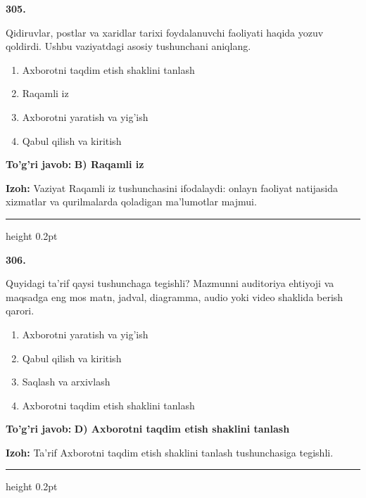 \documentclass[10pt,a4paper,oneside]{article}
\begin{document}
\noindent\textbf{\color{ink}305.}
\par
Qidiruvlar, postlar va xaridlar tarixi foydalanuvchi faoliyati haqida yozuv qoldirdi. Ushbu vaziyatdagi asosiy tushunchani aniqlang.
\begin{enumerate}[label=\Alph*),leftmargin=9mm]
\item Axborotni taqdim etish shaklini tanlash
\item Raqamli iz
\item Axborotni yaratish va yig'ish
\item Qabul qilish va kiritish
\end{enumerate}
\begin{tcolorbox}[enhanced,breakable,colback=teal!4,colframe=teal!50!black,boxrule=0.5pt,arc=1.1mm,left=3mm,right=3mm,top=1.7mm,bottom=1.7mm,before skip=2mm,after skip=2mm]
\textbf{\color{teal}To'g'ri javob:} \textbf{B) Raqamli iz}
\par\smallskip
\textbf{Izoh:} Vaziyat Raqamli iz tushunchasini ifodalaydi: onlayn faoliyat natijasida xizmatlar va qurilmalarda qoladigan ma'lumotlar majmui.
\end{tcolorbox}
\vspace{2mm}\hrule height 0.2pt \vspace{3mm}

\noindent\textbf{\color{ink}306.}
\par
Quyidagi ta'rif qaysi tushunchaga tegishli? Mazmunni auditoriya ehtiyoji va maqsadga eng mos matn, jadval, diagramma, audio yoki video shaklida berish qarori.
\begin{enumerate}[label=\Alph*),leftmargin=9mm]
\item Axborotni yaratish va yig'ish
\item Qabul qilish va kiritish
\item Saqlash va arxivlash
\item Axborotni taqdim etish shaklini tanlash
\end{enumerate}
\begin{tcolorbox}[enhanced,breakable,colback=teal!4,colframe=teal!50!black,boxrule=0.5pt,arc=1.1mm,left=3mm,right=3mm,top=1.7mm,bottom=1.7mm,before skip=2mm,after skip=2mm]
\textbf{\color{teal}To'g'ri javob:} \textbf{D) Axborotni taqdim etish shaklini tanlash}
\par\smallskip
\textbf{Izoh:} Ta'rif Axborotni taqdim etish shaklini tanlash tushunchasiga tegishli.
\end{tcolorbox}
\vspace{2mm}\hrule height 0.2pt \vspace{3mm}
\end{document}
